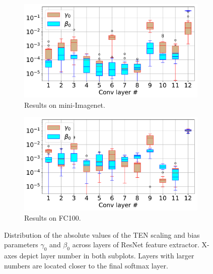 \documentclass{article}
\begin{document}
\begin{figure}[t]
    \centering
    \begin{subfigure}[t]{0.49\textwidth}
        \includegraphics[width=\textwidth]{beta_gamma_MIN.pdf}
        \caption{Results on mini-Imagenet.}
        \label{fig:tbn_scaling_miniimagenet}
    \end{subfigure}
    \begin{subfigure}[t]{0.49\textwidth}
        \includegraphics[width=\textwidth]{beta_gamma_CIFAR100.pdf}
        \caption{Results on FC100.}
        \label{fig:tbn_scaling_cifar100}
    \end{subfigure}
    \caption{Distribution of the absolute values of the TEN scaling and bias parameters $\gamma_0$ and $\beta_0$ across layers of ResNet feature extractor. X-axes depict layer number in both subplots. Layers with larger numbers are located closer to the final softmax layer.}
    \label{fig:tbn_scaling}
\end{figure}
\end{document}
